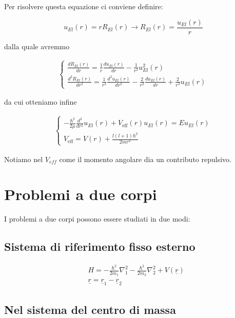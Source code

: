 Per risolvere questa equazione ci conviene definire:

\begin{equation}
u_{E l}(r)= r R_{E l}(r) \rightarrow R_{E l}(r)= \frac{u_{E l}(r)}{r}
\end{equation}

dalla quale avremmo

\begin{align}
\left\{
\begin{array}{cc}
\frac{d R_{E l}(r)}{dr} = \frac{1}{r}\frac{d u_{E l}(r)}{d r} - \frac{1}{r^2}u^2_{El}(r)  \qquad \qquad \quad \: \\
\frac{d^2 R_{E l}(r)}{dr^2} = \frac{1}{r^2}\frac{d^2 u_{E l}(r)}{dr^2} - \frac{2}{r^2}\frac{d u_{E l}(r)}{dr} + \frac{2}{r^3} u_{E l}(r)
\end{array}
\right.
\end{align}

da cui otteniamo infine

\begin{align}
\left\{
\begin{array}{cc}
-\frac{\hbar^2}{2 \mu} \frac{d^2 }{dr^2} u_{E l}(r) + V_{\text{eff}}(r)u_{E l}(r) = E u_{E l}(r) \\
V_{\text{eff}}= V(r) +  \frac{l(l+1)\hbar^2}{2m r^2} \qquad\qquad\qquad
\end{array}
\right.
\end{align}

Notiamo nel $V_{eff}$ come il momento angolare dia un contributo repulsivo.
\newpage
\section{Problemi a due corpi}
I problemi a due corpi possono essere studiati in due modi:

\subsection{Sistema di riferimento fisso esterno} 
	\begin{align}
	{}&H= -\frac{\hbar^2}{2 m_1}\nabla_1^2 -\frac{\hbar^2}{2 m_2}\nabla_2^2 + V(\underline{r}) \\ 
	&\underline{r}= \underline{r}_1 - \underline{r}_2
	\end{align}

\subsection{Nel sistema del centro di massa}
	
